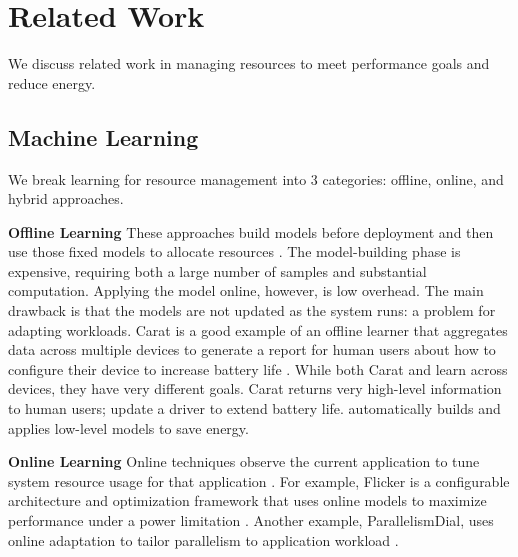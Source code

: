 \section{Related Work}

We discuss related work in managing resources to meet performance
goals and reduce energy.  

\subsection{Machine Learning}
We break learning for resource management into 3 categories: offline,
online, and hybrid approaches.

\noindent \textbf{Offline Learning} These approaches build models
before deployment and then use those fixed models to allocate
resources
\cite{Yi2003,LeeBrooks2006,CPR,ChenJohn2011,petabricksStatic}.  The
model-building phase is expensive, requiring both a large number of
samples and substantial computation.  Applying the model online,
however, is low overhead.  The main drawback is that the models are
not updated as the system runs: a problem for adapting workloads.
  Carat is a good example of an
offline learner that aggregates data across multiple devices to
generate a report for human users about how to configure their device
to increase battery life \cite{carat}.  While both Carat and \SYSTEM{}
learn across devices, they have very different goals.  Carat returns
very high-level information to human users; \eg{} update a driver to
extend battery life.  \SYSTEM{} automatically builds and applies
low-level models to save energy.

\noindent \textbf{Online Learning} Online techniques observe the
current application to tune system resource usage for that application
\cite{Li2006,Flicker,ParallelismDial,Ponamarev,petabricksDynamic,LeeBrooks}.
For example, Flicker is a configurable architecture and optimization
framework that uses online models to maximize performance under a
power limitation \cite{Flicker}.  Another example, ParallelismDial,
uses online adaptation to tailor parallelism to application workload
\cite{ParallelismDial}.



